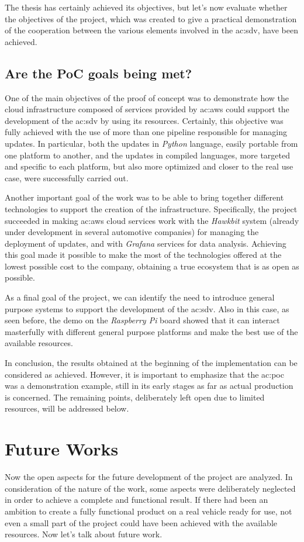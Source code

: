 The thesis has certainly achieved its objectives, but let's now evaluate whether the objectives of the project, which was created to give a practical demonstration of the cooperation between the various elements involved in the \gls{ac:sdv}, have been achieved.

\subsection{Are the PoC goals being met?}
One of the main objectives of the proof of concept was to demonstrate how the cloud infrastructure composed of services provided by \gls{ac:aws} could support the development of the \gls{ac:sdv} by using its resources. Certainly, this objective was fully achieved with the use of more than one pipeline responsible for managing updates. In particular, both the updates in \textit{Python} language, easily portable from one platform to another, and the updates in compiled languages, more targeted and specific to each platform, but also more optimized and closer to the real use case, were successfully carried out.

Another important goal of the work was to be able to bring together different technologies to support the creation of the infrastructure. Specifically, the project succeeded in making \gls{ac:aws} cloud services work with the \textit{Hawkbit} system (already under development in several automotive companies) for managing the deployment of updates, and with \textit{Grafana} services for data analysis. Achieving this goal made it possible to make the most of the technologies offered at the lowest possible cost to the company, obtaining a true ecosystem that is as open as possible.

As a final goal of the project, we can identify the need to introduce general purpose systems to support the development of the \gls{ac:sdv}. Also in this case, as seen before, the demo on the \textit{Raspberry Pi} board showed that it can interact masterfully with different general purpose platforms and make the best use of the available resources.

In conclusion, the results obtained at the beginning of the implementation can be considered as achieved. However, it is important to emphasize that the \gls{ac:poc} was a demonstration example, still in its early stages as far as actual production is concerned. The remaining points, deliberately left open due to limited resources, will be addressed below.

\section{Future Works}
Now the open aspects for the future development of the project are analyzed. In consideration of the nature of the work, some aspects were deliberately neglected in order to achieve a complete and functional result. If there had been an ambition to create a fully functional product on a real vehicle ready for use, not even a small part of the project could have been achieved with the available resources. Now let's talk about future work.

